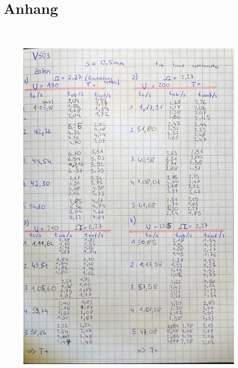 \section{Anhang}

\begin{figure}[H]
    \centering
    \includegraphics[height=190mm]{bilder/1.jpeg}
\end{figure}

